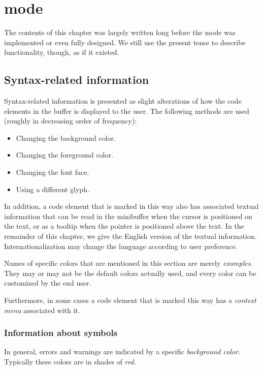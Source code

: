 \chapter{\cl{} mode}

The contents of this chapter was largely written long before the \cl{}
mode was implemented or even fully designed.  We still use the present
tense to describe functionality, though, as if it existed. 

\section{Syntax-related information}

Syntax-related information is presented as slight alterations of how
the code elements in the buffer is displayed to the user.  The
following methods are used (roughly in decreasing order of frequency):

\begin{itemize}
\item Changing the background color.
\item Changing the foreground color.
\item Changing the font face.
\item Using a different glyph.
\end{itemize}

In addition, a code element that is marked in this way also has
associated textual information that can be read in the minibuffer when
the cursor is positioned on the text, or as a tooltip when the pointer
is positioned above the text.  In the remainder of this chapter, we
give the English version of the textual information.
Internationalization may change the language according to user
preference.

Names of specific colors that are mentioned in this section are merely
\emph{examples}.  They may or may not be the default colors actually
used, and every color can be customized by the end user. 

Furthermore, in some cases a code element that is marked this way has
a \emph{context menu} associated with it.

\subsection{Information about symbols}

In general, errors and warnings are indicated by a specific
\emph{background color}.  Typically these colors are in shades of
\emph{red}. 

